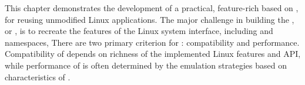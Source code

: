 This chapter
demonstrates the development of a practical, feature-rich \libos{} based on
\thehostabi{},
for reusing unmodified Linux applications.
The major challenge in building the \libos{},
or \thelibos{},
is to recreate the features of the Linux system interface, including
\linuxapis{} and namespaces, %
There are two
primary criterion for \thelibos{}:
compatibility and performance.
Compatibility of \thelibos{} depends on
richness of the implemented Linux features and API,
while performance of \thelibos{} is often determined
by the emulation strategies
based on characteristics of \thehostabi{}.





